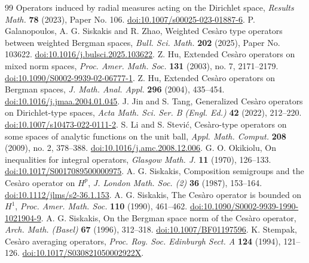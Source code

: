 \documentclass[preprint,12pt,times]{elsarticle}
\theoremstyle{definition}
\theoremstyle{remark}
\numberwithin{equation}{section}
\begin{document}
\begin{thebibliography}{99}
Operators induced by radial measures acting on the Dirichlet space,
\emph{Results Math.} \textbf{78} (2023), Paper No. 106. \href{https://doi.org/10.1007/s00025-023-01887-6}{doi:10.1007/s00025-023-01887-6}.
P. Galanopoulos, A. G. Siskakis and R. Zhao,
Weighted Ces\`aro type operators between weighted Bergman spaces,
\emph{Bull. Sci. Math.} \textbf{202} (2025), Paper No. 103622. \href{https://doi.org/10.1016/j.bulsci.2025.103622}{doi:10.1016/j.bulsci.2025.103622}.
Z. Hu,
Extended Ces\`aro operators on mixed norm spaces,
\emph{Proc. Amer. Math. Soc.} \textbf{131} (2003), no. 7, 2171--2179. \href{https://doi.org/10.1090/S0002-9939-02-06777-1}{doi:10.1090/S0002-9939-02-06777-1}.
Z. Hu,
Extended Ces\`aro operators on Bergman spaces,
\emph{J. Math. Anal. Appl.} \textbf{296} (2004), 435--454. \href{https://doi.org/10.1016/j.jmaa.2004.01.045}{doi:10.1016/j.jmaa.2004.01.045}.
J. Jin and S. Tang,
Generalized Ces\`aro operators on Dirichlet-type spaces,
\emph{Acta Math. Sci. Ser. B (Engl. Ed.)} \textbf{42} (2022), 212--220. \href{https://doi.org/10.1007/s10473-022-0111-2}{doi:10.1007/s10473-022-0111-2}.
S. Li and S. Stevi{\'c},
Ces{\`a}ro-type operators on some spaces of analytic functions on the unit ball,
\emph{Appl. Math. Comput.} \textbf{208} (2009), no. 2, 378--388. \href{https://doi.org/10.1016/j.amc.2008.12.006}{doi:10.1016/j.amc.2008.12.006}.
G. O. Okikiolu,
On inequalities for integral operators,
\emph{Glasgow Math. J.} \textbf{11} (1970), 126--133. \href{https://doi.org/10.1017/S0017089500000975}{doi:10.1017/S0017089500000975}.
A. G. Siskakis,
Composition semigroups and the Ces\`aro operator on $H^p$,
\emph{J. London Math. Soc. (2)} \textbf{36} (1987), 153--164. \href{https://doi.org/10.1112/jlms/s2-36.1.153}{doi:10.1112/jlms/s2-36.1.153}.
A. G. Siskakis,
The Ces\`aro operator is bounded on $H^1$,
\emph{Proc. Amer. Math. Soc.} \textbf{110} (1990), 461--462. \href{https://doi.org/10.1090/S0002-9939-1990-1021904-9}{doi:10.1090/S0002-9939-1990-1021904-9}.
A. G. Siskakis,
On the Bergman space norm of the Ces\`aro operator,
\emph{Arch. Math. (Basel)} \textbf{67} (1996), 312--318. \href{https://doi.org/10.1007/BF01197596}{doi:10.1007/BF01197596}.
K. Stempak,
Ces\`aro averaging operators,
\emph{Proc. Roy. Soc. Edinburgh Sect. A} \textbf{124} (1994), 121--126. \href{https://doi.org/10.1017/S030821050002922X}{doi:10.1017/S030821050002922X}.

\end{thebibliography}
\end{document}
